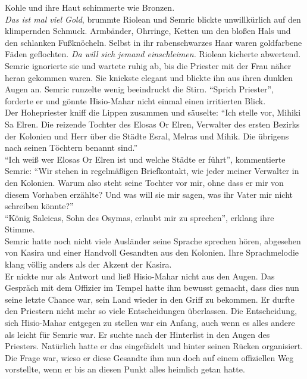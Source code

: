 Kohle und ihre Haut schimmerte wie Bronzen.\\
\textit{Das ist mal viel Gold}, brummte Riolean und Semric blickte unwillkürlich auf den 
klimpernden Schmuck. Armbänder, Ohrringe, Ketten um den bloßen Hals und den schlanken Fußknöcheln. 
Selbst in ihr rabenschwarzes Haar waren goldfarbene Fäden geflochten. \textit{Da will sich jemand 
einschleimen.} Riolean kicherte abwertend.\\
Semric ignorierte sie und wartete ruhig ab, bis die Priester mit der Frau näher heran gekommen 
waren. Sie knickste elegant und blickte ihn aus ihren dunklen Augen an. Semric runzelte wenig 
beeindruckt die Stirn. ``Sprich Priester'', forderte er und gönnte Hisio-Mahar nicht einmal einen 
irritierten Blick.\\
Der Hohepriester kniff die Lippen zusammen und säuselte: ``Ich stelle vor, Mihiki Sa Elren. Die 
reizende Tochter des Elosas Or Elren, Verwalter des ersten Bezirks der Kolonien und Herr über die 
Städte Esral, Melras und Mihik. Die übrigens nach seinen Töchtern benannt sind.''\\
``Ich weiß wer Elosas Or Elren ist und welche Städte er führt'', kommentierte Semric: ``Wir stehen 
in regelmäßigen Briefkontakt, wie jeder meiner Verwalter in den Kolonien. Warum also steht seine 
Tochter vor mir, ohne dass er mir von diesem Vorhaben erzählte? Und was will sie mir sagen, was ihr 
Vater mir nicht schreiben könnte?''\\
``König Saleicas, Sohn des Osymas, erlaubt mir zu sprechen'', erklang ihre Stimme.\\
Semric hatte noch nicht viele Ausländer seine Sprache sprechen hören, abgesehen von Kasira und 
einer Handvoll Gesandten aus den Kolonien. Ihre Sprachmelodie klang völlig anders als der Akzent 
der Kasira.\\
Er nickte nur als Antwort und ließ Hisio-Mahar nicht aus den Augen. Das Gespräch mit dem Offizier 
im Tempel hatte ihm bewusst gemacht, dass dies nun seine letzte Chance war, sein Land wieder in den 
Griff zu bekommen. Er durfte den Priestern nicht mehr so viele Entscheidungen überlassen. Die 
Entscheidung, sich Hisio-Mahar entgegen zu stellen war ein Anfang, auch wenn es alles andere als 
leicht für Semric war. Er suchte nach der Hinterlist in den Augen des Priesters. Natürlich hatte er 
das eingefädelt und hinter seinen Rücken organisiert. Die Frage war, wieso er diese Gesandte ihm 
nun doch auf einem offiziellen Weg vorstellte, wenn er bis an diesen Punkt alles heimlich getan 
hatte.\\
